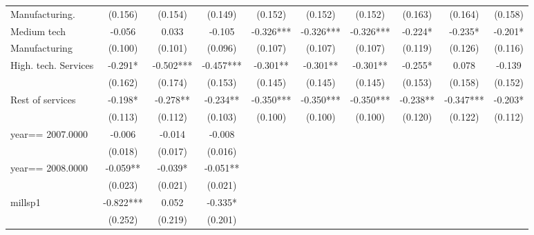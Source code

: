 \begin{table}[htbp]
\begin{tabular}{l*{9}{c}}
Manufacturing.      &     (0.156)   &     (0.154)   &     (0.149)   &     (0.152)   &     (0.152)   &     (0.152)   &     (0.163)   &     (0.164)   &     (0.158)   \\
Medium tech         &      -0.056   &       0.033   &      -0.105   &      -0.326***&      -0.326***&      -0.326***&      -0.224*  &      -0.235*  &      -0.201*  \\
Manufacturing       &     (0.100)   &     (0.101)   &     (0.096)   &     (0.107)   &     (0.107)   &     (0.107)   &     (0.119)   &     (0.126)   &     (0.116)   \\
High. tech. Services&      -0.291*  &      -0.502***&      -0.457***&      -0.301** &      -0.301** &      -0.301** &      -0.255*  &       0.078   &      -0.139   \\
                    &     (0.162)   &     (0.174)   &     (0.153)   &     (0.145)   &     (0.145)   &     (0.145)   &     (0.153)   &     (0.158)   &     (0.152)   \\
Rest of services    &      -0.198*  &      -0.278** &      -0.234** &      -0.350***&      -0.350***&      -0.350***&      -0.238** &      -0.347***&      -0.203*  \\
                    &     (0.113)   &     (0.112)   &     (0.103)   &     (0.100)   &     (0.100)   &     (0.100)   &     (0.120)   &     (0.122)   &     (0.112)   \\
year==  2007.0000   &      -0.006   &      -0.014   &      -0.008   &               &               &               &               &               &               \\
                    &     (0.018)   &     (0.017)   &     (0.016)   &               &               &               &               &               &               \\
year==  2008.0000   &      -0.059** &      -0.039*  &      -0.051** &               &               &               &               &               &               \\
                    &     (0.023)   &     (0.021)   &     (0.021)   &               &               &               &               &               &               \\
millsp1             &      -0.822***&       0.052   &      -0.335*  &               &               &               &               &               &               \\
                    &     (0.252)   &     (0.219)   &     (0.201)   &               &               &               &               &               &               \\

\end{tabular}
\end{table}
